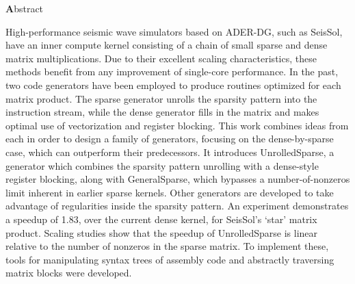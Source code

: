 
\clearemptydoublepage
{}
{}

\vspace*{2cm}
\begin{center}
{\Large \textbf Abstract}
\end{center}
\vspace{1cm}



High-performance seismic wave simulators based on ADER-DG, such as SeisSol, have an inner compute kernel consisting of a chain of small sparse and dense matrix multiplications. Due to their excellent scaling characteristics, these methods benefit from any improvement of single-core performance. In the past, two code generators have been employed to produce routines optimized for each matrix product. The sparse generator unrolls the sparsity pattern into the instruction stream, while the dense generator fills in the matrix and makes optimal use of vectorization and register blocking. This work combines ideas from each in order to design a family of generators, focusing on the dense-by-sparse case, which can outperform their predecessors. It introduces UnrolledSparse, a generator which combines the sparsity pattern unrolling with a dense-style register blocking, along with GeneralSparse, which bypasses a number-of-nonzeros limit inherent in earlier sparse kernels. Other generators are developed to take advantage of regularities inside the sparsity pattern. An experiment demonstrates a speedup of 1.83, over the current dense kernel, for SeisSol's `star' matrix product. Scaling studies show that the speedup of UnrolledSparse is linear relative to the number of nonzeros in the sparse matrix. To implement these, tools for manipulating syntax trees of assembly code and abstractly traversing matrix blocks were developed.

